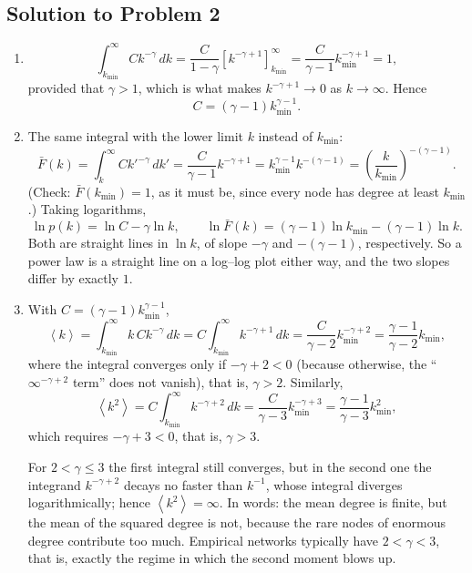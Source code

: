 \documentclass[a4paper,12pt]{article}
\newcommand{\dd}{\,d}
\begin{document}
\subsection*{Solution to Problem 2}

\begin{enumerate}[label=(\alph*)]
\item
\[ \int_{k_{\min}}^{\infty} Ck^{-\gamma} \dd k
= \frac{C}{1-\gamma}\left[ k^{-\gamma+1} \right]_{k_{\min}}^{\infty}
= \frac{C}{\gamma-1}k_{\min}^{-\gamma+1} = 1 , \]
provided that $\gamma>1$, which is what makes $k^{-\gamma+1} \to 0$ as $k\to\infty$. Hence
\[ C = (\gamma-1)k_{\min}^{\gamma-1} . \]

\item The same integral with the lower limit $k$ instead of $k_{\min}$:
\[ \bar{F}(k) = \int_{k}^{\infty} C k'^{-\gamma}\dd k' = \frac{C}{\gamma-1}k^{-\gamma+1}
= k_{\min}^{\gamma-1}k^{-(\gamma-1)} = \left( \frac{k}{k_{\min}} \right)^{-(\gamma-1)} . \]
(Check: $\bar F(k_{\min})=1$, as it must be, since every node has degree at least $k_{\min}$.) Taking logarithms,
\[ \ln p(k) = \ln C - \gamma \ln k,
\qquad
\ln \bar{F}(k) = (\gamma-1)\ln k_{\min} - (\gamma-1)\ln k . \]
Both are straight lines in $\ln k$, of slope $-\gamma$ and $-(\gamma-1)$, respectively. So a power law is a straight line on a log--log plot either way, and the two slopes differ by exactly $1$.


\item With $C=(\gamma-1)k_{\min}^{\gamma-1}$,
\[ \left\langle k \right\rangle = \int_{k_{\min}}^{\infty}k\,Ck^{-\gamma}\dd k
= C\int_{k_{\min}}^{\infty}k^{-\gamma+1}\dd k
= \frac{C}{\gamma-2}k_{\min}^{-\gamma+2}
= \frac{\gamma-1}{\gamma-2}k_{\min} , \]
where the integral converges only if $-\gamma+2<0$ (because otherwise, the ``$\infty^{-\gamma+2}$ term'' does not vanish), that is, $\gamma>2$. Similarly,
\[ \left\langle k^2 \right\rangle = C\int_{k_{\min}}^{\infty}k^{-\gamma+2}\dd k
= \frac{C}{\gamma-3}k_{\min}^{-\gamma+3}
= \frac{\gamma-1}{\gamma-3}k_{\min}^2 , \]
which requires $-\gamma+3<0$, that is, $\gamma>3$.

For $2<\gamma \leq 3$ the first integral still converges, but in the second one the integrand $k^{-\gamma+2}$ decays no faster than $k^{-1}$, whose integral diverges logarithmically; hence $\left\langle k^2 \right\rangle=\infty$. In words: the mean degree is finite, but the mean of the squared degree is not, because the rare nodes of enormous degree contribute too much. Empirical networks typically have $2<\gamma<3$, that is, exactly the regime in which the second moment blows up.


\end{enumerate}
\end{document}

